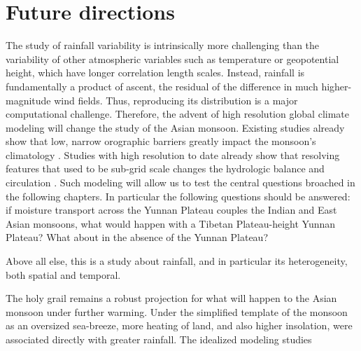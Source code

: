 \section{Future directions}

	The study of rainfall variability is intrinsically more challenging than the variability of other atmospheric variables such as temperature or geopotential height, which have longer correlation length scales. Instead, rainfall is fundamentally a product of ascent, the residual of the difference in much higher-magnitude wind fields. Thus, reproducing its distribution is a major computational challenge. Therefore, the advent of high resolution global climate modeling will change the study of the Asian monsoon. Existing studies already show that low, narrow orographic barriers greatly impact the monsoon's climatology \citep{Xie2006}. Studies with high resolution to date already show that resolving features that used to be sub-grid scale changes the hydrologic balance and circulation \citep{Risi2010,Boos2013a,Wu2014a,Wu2016}. Such modeling will allow us to test the central questions broached in the following chapters. In particular the following questions should be answered: if moisture transport across the Yunnan Plateau couples the Indian and East Asian monsoons, what would happen with a Tibetan Plateau-height Yunnan Plateau? What about in the absence of the Yunnan Plateau?
	
	Above all else, this is a study about rainfall, and in particular its heterogeneity, both spatial and temporal. 
	
	The holy grail remains a robust projection for what will happen to the Asian monsoon under further warming. Under the simplified template of the monsoon as an oversized sea-breeze, more heating of land, and also higher insolation, were associated directly with greater rainfall. The idealized modeling studies 